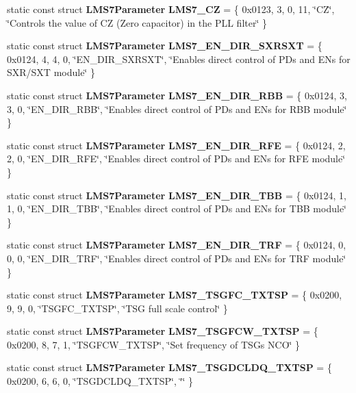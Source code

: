 \begin{DoxyCompactItemize}
\item 
static const struct {\bf L\+M\+S7\+Parameter} {\bf L\+M\+S7\+\_\+\+CZ} = \{ 0x0123, 3, 0, 11, \char`\"{}\+C\+Z\char`\"{}, \char`\"{}\+Controls the value of C\+Z (\+Zero capacitor) in the P\+L\+L filter\char`\"{} \}
\item 
static const struct {\bf L\+M\+S7\+Parameter} {\bf L\+M\+S7\+\_\+\+E\+N\+\_\+\+D\+I\+R\+\_\+\+S\+X\+R\+S\+XT} = \{ 0x0124, 4, 4, 0, \char`\"{}\+E\+N\+\_\+\+D\+I\+R\+\_\+\+S\+X\+R\+S\+X\+T\char`\"{}, \char`\"{}\+Enables direct control of P\+Ds and E\+Ns for S\+X\+R/\+S\+X\+T module\char`\"{} \}
\item 
static const struct {\bf L\+M\+S7\+Parameter} {\bf L\+M\+S7\+\_\+\+E\+N\+\_\+\+D\+I\+R\+\_\+\+R\+BB} = \{ 0x0124, 3, 3, 0, \char`\"{}\+E\+N\+\_\+\+D\+I\+R\+\_\+\+R\+B\+B\char`\"{}, \char`\"{}\+Enables direct control of P\+Ds and E\+Ns for R\+B\+B module\char`\"{} \}
\item 
static const struct {\bf L\+M\+S7\+Parameter} {\bf L\+M\+S7\+\_\+\+E\+N\+\_\+\+D\+I\+R\+\_\+\+R\+FE} = \{ 0x0124, 2, 2, 0, \char`\"{}\+E\+N\+\_\+\+D\+I\+R\+\_\+\+R\+F\+E\char`\"{}, \char`\"{}\+Enables direct control of P\+Ds and E\+Ns for R\+F\+E module\char`\"{} \}
\item 
static const struct {\bf L\+M\+S7\+Parameter} {\bf L\+M\+S7\+\_\+\+E\+N\+\_\+\+D\+I\+R\+\_\+\+T\+BB} = \{ 0x0124, 1, 1, 0, \char`\"{}\+E\+N\+\_\+\+D\+I\+R\+\_\+\+T\+B\+B\char`\"{}, \char`\"{}\+Enables direct control of P\+Ds and E\+Ns for T\+B\+B module\char`\"{} \}
\item 
static const struct {\bf L\+M\+S7\+Parameter} {\bf L\+M\+S7\+\_\+\+E\+N\+\_\+\+D\+I\+R\+\_\+\+T\+RF} = \{ 0x0124, 0, 0, 0, \char`\"{}\+E\+N\+\_\+\+D\+I\+R\+\_\+\+T\+R\+F\char`\"{}, \char`\"{}\+Enables direct control of P\+Ds and E\+Ns for T\+R\+F module\char`\"{} \}
\item 
static const struct {\bf L\+M\+S7\+Parameter} {\bf L\+M\+S7\+\_\+\+T\+S\+G\+F\+C\+\_\+\+T\+X\+T\+SP} = \{ 0x0200, 9, 9, 0, \char`\"{}\+T\+S\+G\+F\+C\+\_\+\+T\+X\+T\+S\+P\char`\"{}, \char`\"{}\+T\+S\+G full scale control\char`\"{} \}
\item 
static const struct {\bf L\+M\+S7\+Parameter} {\bf L\+M\+S7\+\_\+\+T\+S\+G\+F\+C\+W\+\_\+\+T\+X\+T\+SP} = \{ 0x0200, 8, 7, 1, \char`\"{}\+T\+S\+G\+F\+C\+W\+\_\+\+T\+X\+T\+S\+P\char`\"{}, \char`\"{}\+Set frequency of T\+S\+G\textquotesingle{}s N\+C\+O\char`\"{} \}
\item 
static const struct {\bf L\+M\+S7\+Parameter} {\bf L\+M\+S7\+\_\+\+T\+S\+G\+D\+C\+L\+D\+Q\+\_\+\+T\+X\+T\+SP} = \{ 0x0200, 6, 6, 0, \char`\"{}\+T\+S\+G\+D\+C\+L\+D\+Q\+\_\+\+T\+X\+T\+S\+P\char`\"{}, \char`\"{}\char`\"{} \}

\end{DoxyCompactItemize}
